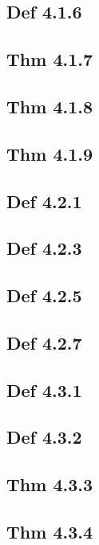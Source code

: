\subsection*{Def 4.1.6}

\subsection*{Thm 4.1.7}

\subsection*{Thm 4.1.8}

\subsection*{Thm 4.1.9}

\subsection*{Def 4.2.1}

\subsection*{Def 4.2.3}

\subsection*{Def 4.2.5}

\subsection*{Def 4.2.7}

\subsection*{Def 4.3.1}

\subsection*{Def 4.3.2}

\subsection*{Thm 4.3.3}

\subsection*{Thm 4.3.4}


